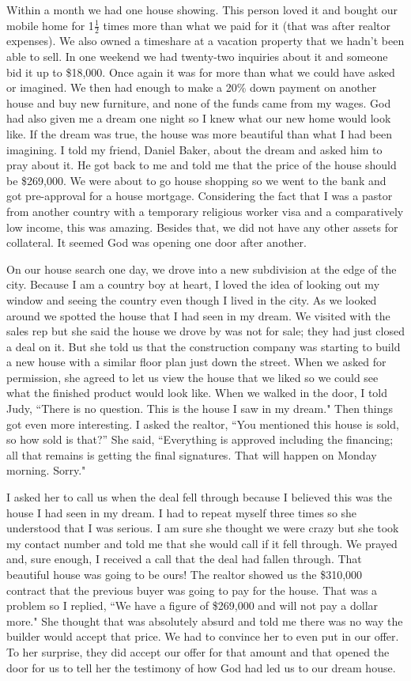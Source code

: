 \documentclass[oneside]{book}
\begin{document}
Within a month we had one house showing. This person loved it and bought our mobile home for 1$\frac{1}{2}$ times more than what we paid for it (that was after realtor expenses). We also owned a timeshare at a vacation property that we hadn't been able to sell. In one weekend we had twenty-two inquiries about it and someone bid it up to \$18,000. Once again it was for more than what we could have asked or imagined. We then had enough to make a 20\% down payment on another house and buy new furniture, and none of the funds came from my wages. God had also given me a dream one night so I knew what our new home would look like. If the dream was true, the house was more beautiful than what I had been imagining. I told my friend, Daniel Baker, about the dream and asked him to pray about it. He got back to me and told me that the price of the house should be \$269,000. We were about to go house shopping so we went to the bank and got pre-approval for a house mortgage. Considering the fact that I was a pastor from another country with a temporary religious worker visa and a comparatively low income, this was amazing. Besides that, we did not have any other assets for collateral. It seemed God was opening one door after another.

On our house search one day, we drove into a new subdivision at the edge of the city. Because I am a country boy at heart, I loved the idea of looking out my window and seeing the country even though I lived in the city. As we looked around we spotted the house that I had seen in my dream. We visited with the sales rep but she said the house we drove by was not for sale; they had just closed a deal on it. But she told us that the construction company was starting to build a new house with a similar floor plan just down the street. When we asked for permission, she agreed to let us view the house that we liked so we could see what the finished product would look like. When we walked in the door, I told Judy, ``There is no question. This is the house I saw in my dream." Then things got even more interesting. I asked the realtor, ``You mentioned this house is sold, so how sold is that?'' She said, ``Everything is approved including the financing; all that remains is getting the final signatures. That will happen on Monday morning. Sorry." 

I asked her to call us when the deal fell through because I believed this was the house I had seen in my dream. I had to repeat myself three times so she understood that I was serious. I am sure she thought we were crazy but she took my contact number and told me that she would call if it fell through. We prayed and, sure enough, I received a call that the deal had fallen through. That beautiful house was going to be ours! The realtor showed us the \$310,000 contract that the previous buyer was going to pay for the house. That was a problem so I replied, ``We have a figure of \$269,000 and will not pay a dollar more." She thought that was absolutely absurd and told me there was no way the builder would accept that price. We had to convince her to even put in our offer. To her surprise, they did accept our offer for that amount and that opened the door for us to tell her the testimony of how God had led us to our dream house.
\end{document}
